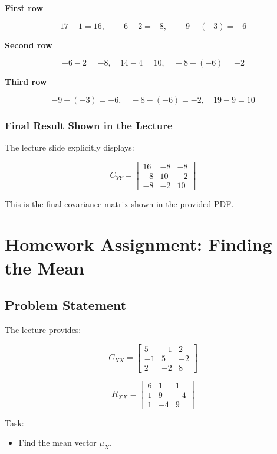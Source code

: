 \documentclass[12pt]{article}
\begin{document}
\textbf{First row}

\[
17 - 1 = 16,\quad -6 - 2 = -8,\quad -9 - (-3) = -6
\]

\textbf{Second row}

\[
-6 - 2 = -8,\quad 14 - 4 = 10,\quad -8 - (-6) = -2
\]

\textbf{Third row}

\[
-9 - (-3) = -6,\quad -8 - (-6) = -2,\quad 19 - 9 = 10
\]

\subsubsection*{Final Result Shown in the Lecture}

The lecture slide explicitly displays:

\[
\boxed{
C_{YY} =
\begin{bmatrix}
16 & -8 & -8 \\
-8 & 10 & -2 \\
-8 & -2 & 10
\end{bmatrix}}
\]

This is the final covariance matrix shown in the provided PDF.

\section{Homework Assignment: Finding the Mean}

\subsection{Problem Statement}

The lecture provides:

\[
C_{XX} =
\begin{bmatrix}
5 & -1 & 2 \\
-1 & 5 & -2 \\
2 & -2 & 8
\end{bmatrix}
\]

\[
R_{XX} =
\begin{bmatrix}
6 & 1 & 1 \\
1 & 9 & -4 \\
1 & -4 & 9
\end{bmatrix}
\]

Task:

\begin{itemize}
    \item Find the mean vector \(\mu_X\).
\end{itemize}
\end{document}
